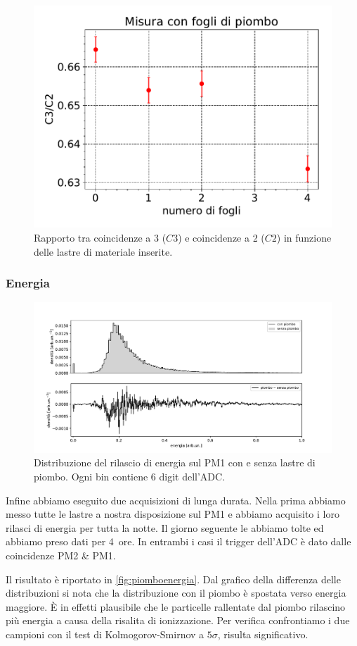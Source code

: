 \begin{figure}
\centering
\includegraphics[width=8 cm]{confronto}
\caption{Rapporto tra coincidenze a 3 ($C3$) e coincidenze a 2 ($C2$) in funzione delle lastre di materiale inserite.}
\label{cfr}
\end{figure}

\subsubsection{Energia}

\begin{figure}
	\hspace{-7.5em}
	\includegraphics[width=1.4\textwidth]{piombo_energia1}
	\caption{\label{fig:piomboenergia}
	Distribuzione del rilascio di energia sul PM1 con e senza lastre di piombo.
	Ogni bin contiene 6 digit dell'ADC.}
\end{figure}

Infine abbiamo eseguito due acquisizioni di lunga durata.
Nella prima abbiamo messo tutte le lastre a nostra disposizione sul PM1
e abbiamo acquisito i loro rilasci di energia per tutta la notte.
Il giorno seguente le abbiamo tolte ed abbiamo preso dati per \SI{4}{ore}.
In entrambi i casi il trigger dell'ADC è dato dalle coincidenze PM2 \& PM1.

Il risultato è riportato in \autoref{fig:piomboenergia}.
Dal grafico della differenza delle distribuzioni
si nota che la distribuzione con il piombo è spostata verso energia maggiore.
È in effetti plausibile che le particelle rallentate dal piombo
rilascino più energia a causa della risalita di ionizzazione.
Per verifica confrontiamo i due campioni con il test di Kolmogorov-Smirnov a $5\sigma$,
risulta significativo.
